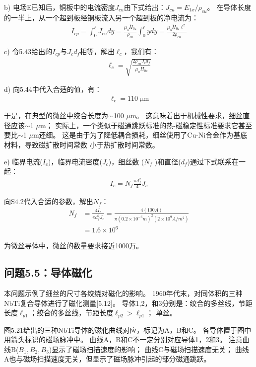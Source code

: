 b) 电场E已知后，铜板中的电流密度$J_{cu}$由下式给出：$J_{cu} = E_{1x}/\rho_{cu}$。
在导体长度的一半上，从一个超到板经铜板流入另一个超到板的净电流为：
\begin{align*}%
I_{cp}=\int_{0}^{\ell}J_{cu}dy=\frac{\mu_{o}\dot{H}_{0z}}{\rho_{cu}}\int_{0}^{\ell}ydy=\frac{\mu_{o}\dot{H}_{0z}\ell^{2}}{2\rho_{cu}}\tag{5.43}
\end{align*}

c) 令5.43给出的$I_{cp}$与$J_c d_f$相等，解出$\ell_c$，我们有：
\begin{align*}%
\ell_{c}=\sqrt{\frac{2\rho_{cu}J_{c}d_{f}}{\mu_{o}\dot{H}_{0z}}}\tag{5.44}
\end{align*}

d) 向5.44中代入合适的值，有：
\begin{align*}%
\ell_{c}=110\ \mathrm{\mu m}
\end{align*}

于是，在典型的微丝中绞合长度为$\sim$100 $\mu$m。
这意味着出于机械性要求，细丝直径应该$\sim$1 $\mu$m；
实际上，一个类似于磁通跳跃标准的热-磁稳定性标准要求它甚至要比$\sim$1 $\mu$m还细。
这是由于为了降低耦合损耗，细丝使用了Cu-Ni合金作为基底材料，导致磁扩散时间常数
小于热扩散时间常数。

e) 临界电流($I_c$)，临界电流密度($J_c$)，细丝数 ($N_f$ )和直径($d_f$)通过下式联系在一起：
\begin{align*}%
I_c=N_f\frac{\pi d_f^2}{4} J_c \tag{S4.2}
\end{align*}

向S4.2代入合适的参数，解出$N_f$：
\begin{align*}%
N_{f}&=\frac{4I_{c}}{\pi d_{f}^{2}J_{c}}=\frac{4(100A)}{\pi(0.2\times10^{-6}m)^{2}(2\times10^{9}A/m^{2})}\\
&=1.6\times 10^{6}
\end{align*}

为微丝导体中，微丝的数量要求接近1000万。



\subsection{问题5.5：导体磁化}
本问题示例了细丝的尺寸各绞绕对磁化的影响。
1960年代末，对同体积的三种NbTi复合导体进行了磁化测量[5.12]。
导体1,2，和3分别是：绞合的多丝线，节距长度$\ell_{p1}$；绞合的多丝线，节距长度$\ell_{p2}>\ell_{p1}$；
单丝。

图5.21给出的三种NbTi导体的磁化曲线对应，标记为A，B和C。
各导体置于图中用箭头标识的磁场脉冲中。
曲线A，B和C不一定分别对应导体1，2和3。
注意曲线B($B_1,B_2,B_3$)显示了磁场扫描速度的影响；
曲线C与磁场扫描速度无关；
曲线A也与磁场扫描速度无关，但显示了磁场脉冲引起的部分磁通跳跃。

